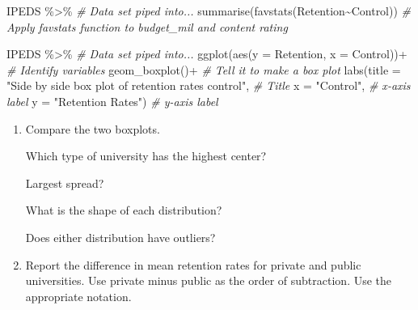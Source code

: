 \documentclass[
]{report}
\newenvironment{Shaded}{\begin{snugshade}}{\end{snugshade}}
\newcommand{\AttributeTok}[1]{\textcolor[rgb]{0.77,0.63,0.00}{#1}}
\newcommand{\CommentTok}[1]{\textcolor[rgb]{0.56,0.35,0.01}{\textit{#1}}}
\newcommand{\FunctionTok}[1]{\textcolor[rgb]{0.00,0.00,0.00}{#1}}
\newcommand{\NormalTok}[1]{#1}
\newcommand{\SpecialCharTok}[1]{\textcolor[rgb]{0.00,0.00,0.00}{#1}}
\newcommand{\StringTok}[1]{\textcolor[rgb]{0.31,0.60,0.02}{#1}}
\begin{document}
\begin{Shaded}
\begin{Highlighting}[]
\NormalTok{IPEDS }\SpecialCharTok{\%\textgreater{}\%}  \CommentTok{\# Data set piped into...}
  \FunctionTok{summarise}\NormalTok{(}\FunctionTok{favstats}\NormalTok{(Retention}\SpecialCharTok{\textasciitilde{}}\NormalTok{Control)) }\CommentTok{\# Apply favstats function to budget\_mil and content rating}
\end{Highlighting}
\end{Shaded}

\begin{Shaded}
\begin{Highlighting}[]
\NormalTok{IPEDS }\SpecialCharTok{\%\textgreater{}\%}  \CommentTok{\# Data set piped into...}
  \FunctionTok{ggplot}\NormalTok{(}\FunctionTok{aes}\NormalTok{(}\AttributeTok{y =}\NormalTok{ Retention, }\AttributeTok{x =}\NormalTok{ Control))}\SpecialCharTok{+}  \CommentTok{\# Identify variables}
  \FunctionTok{geom\_boxplot}\NormalTok{()}\SpecialCharTok{+}  \CommentTok{\# Tell it to make a box plot}
  \FunctionTok{labs}\NormalTok{(}\AttributeTok{title =} \StringTok{"Side by side box plot of retention rates control"}\NormalTok{,  }\CommentTok{\# Title}
       \AttributeTok{x =} \StringTok{"Control"}\NormalTok{,    }\CommentTok{\# x{-}axis label}
       \AttributeTok{y =} \StringTok{"Retention Rates"}\NormalTok{)  }\CommentTok{\# y{-}axis label}
\end{Highlighting}
\end{Shaded}

\begin{enumerate}
\def\labelenumi{\arabic{enumi}.}
\setcounter{enumi}{11}
\item
  Compare the two boxplots.

  Which type of university has the highest center?
  \vspace{0.3in}

  Largest spread?
  \vspace{0.3in}

  What is the shape of each distribution?
  \vspace{0.3in}

  Does either distribution have outliers?
  \vspace{0.3in}
\item
  Report the difference in mean retention rates for private and public universities. Use private minus public as the order of subtraction. Use the appropriate notation.
\end{enumerate}
\end{document}
